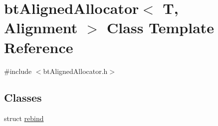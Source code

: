 \hypertarget{classbtAlignedAllocator}{}\section{bt\+Aligned\+Allocator$<$ T, Alignment $>$ Class Template Reference}
\label{classbtAlignedAllocator}


{\ttfamily \#include $<$bt\+Aligned\+Allocator.\+h$>$}

\subsection*{Classes}
\begin{DoxyCompactItemize}
\item 
struct \hyperlink{structbtAlignedAllocator_1_1rebind}{rebind}
\end{DoxyCompactItemize}
